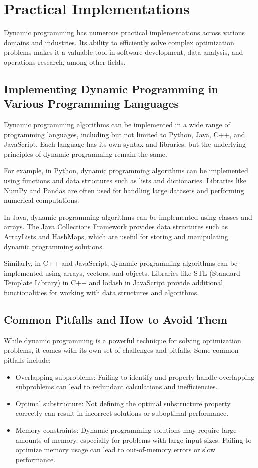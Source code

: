 \documentclass[12pt]{book} %
\begin{document}
\section{Practical Implementations}

Dynamic programming has numerous practical implementations across various domains and industries. Its ability to efficiently solve complex optimization problems makes it a valuable tool in software development, data analysis, and operations research, among other fields.

\subsection{Implementing Dynamic Programming in Various Programming Languages}

Dynamic programming algorithms can be implemented in a wide range of programming languages, including but not limited to Python, Java, C++, and JavaScript. Each language has its own syntax and libraries, but the underlying principles of dynamic programming remain the same.

For example, in Python, dynamic programming algorithms can be implemented using functions and data structures such as lists and dictionaries. Libraries like NumPy and Pandas are often used for handling large datasets and performing numerical computations.

In Java, dynamic programming algorithms can be implemented using classes and arrays. The Java Collections Framework provides data structures such as ArrayLists and HashMaps, which are useful for storing and manipulating dynamic programming solutions.

Similarly, in C++ and JavaScript, dynamic programming algorithms can be implemented using arrays, vectors, and objects. Libraries like STL (Standard Template Library) in C++ and lodash in JavaScript provide additional functionalities for working with data structures and algorithms.

\subsection{Common Pitfalls and How to Avoid Them}

While dynamic programming is a powerful technique for solving optimization problems, it comes with its own set of challenges and pitfalls. Some common pitfalls include:

\begin{itemize}
    \item Overlapping subproblems: Failing to identify and properly handle overlapping subproblems can lead to redundant calculations and inefficiencies.
    \item Optimal substructure: Not defining the optimal substructure property correctly can result in incorrect solutions or suboptimal performance.
    \item Memory constraints: Dynamic programming solutions may require large amounts of memory, especially for problems with large input sizes. Failing to optimize memory usage can lead to out-of-memory errors or slow performance.
\end{itemize}
\end{document}
